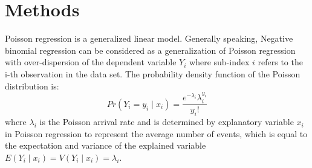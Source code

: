 \documentclass[num-refs]{wiley-article}
\begin{document}
\begin{table}[htbp]
\caption{Descriptive statistics of a panel data set for 182 drivers observed over six days (total cases 1092).}
\label{panel}
\end{table}


\section{Methods}
Poisson regression is a generalized linear model. Generally speaking, Negative binomial regression can be considered as a generalization of Poisson regression with over-dispersion of the dependent variable $Y_i$ where sub-index $i$ refers to the i-th observation in the data set. The probability density function of the Poisson distribution is:
\begin{equation}
    Pr(Y_i=y_i\mid x_i)=\frac{e^{-\lambda _i} \lambda_i ^{y_i}} {y_i!} 
\end{equation}
where $\lambda_i$ is the Poisson arrival rate and is determined by explanatory variable $x_i$ in Poisson regression to represent the average number of events, which is equal to the expectation and variance of the explained variable $E(Y_i\mid x_i)=V(Y_i\mid x_i)=\lambda_i$.
\end{document}
